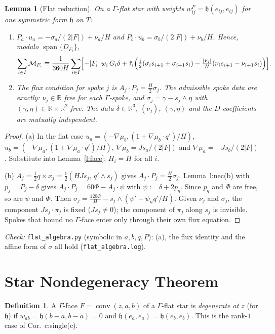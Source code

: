 \documentclass[11pt]{article}
\newtheorem{lemma}[theorem]{Lemma}
\theoremstyle{definition}
\newtheorem{definition}[theorem]{Definition}
\newcommand{\R}{\mathbb R}
\newcommand{\M}{\mathcal M}
\newcommand{\hh}{\mathfrak h}
\DeclareMathOperator{\conv}{conv}
\begin{document}
\begin{lemma}[Flat reduction]\label{l:flat}
On a $\Gamma$-flat star with weights $w^{F}_{ij}=\hh(e_{ij},e_{ij})$ for one symmetric form $\hh$ on $T$:
\begin{enumerate}[label=(\alph*)]
\item $P_a\cdot u_a=-\sigma_a/(2|F|)+\nu_a/H$ and $P_b\cdot u_b=\sigma_b/(2|F|)+\nu_b/H$. Hence, modulo $\operatorname{span}\{D_{F_i}\}$,
\[
\sum_{i\in I}\M_{F_i}\equiv\frac1{360H}\sum_{i\in I}\Bigl[-|F_i|\,w_i\,G_i\delta+\hat\tau_i\Bigl(\tfrac12(\sigma_is_{i+1}+\sigma_{i+1}s_i)-\tfrac{|F_i|}{H}(\nu_is_{i+1}-\nu_{i+1}s_i)\Bigr)\Bigr].
\]
\item The flux condition for spoke $j$ is $A_j\cdot P_j=\frac H2\sigma_j$. The admissible spoke data are exactly: $\nu_j\in\R$ free for each $\Gamma$-spoke, and $\sigma_j=\gamma-s_j\wedge\eta$ with $(\gamma,\eta)\in\R\times\R^2$ free. The data $\delta\in\R^3$, $(\nu_j)$, $(\gamma,\eta)$ and the $D$-coefficients are mutually independent.
\end{enumerate}
\end{lemma}
\begin{proof}
(a) In the flat case $u_a=(-\nabla\mu_b,(1+\nabla\mu_b\cdot q')/H)$, $u_b=(-\nabla\mu_a,(1+\nabla\mu_a\cdot q')/H)$, $\nabla\mu_b=Js_a/(2|F|)$ and $\nabla\mu_a=-Js_b/(2|F|)$. Substitute into Lemma~\ref{l:face}; $H_i=H$ for all $i$.

(b) $A_j=\frac12q\times x_j=\frac12(HJs_j,\,q'\wedge s_j)$ gives $A_j\cdot P_j=\frac H2\sigma_j$. Lemma~l:nec(b) with $p_j=P_j-\delta$ gives $A_j\cdot P_j=60\Phi-A_j\cdot\psi$ with $\psi:=\delta+2p_q$. Since $p_q$ and $\Phi$ are free, so are $\psi$ and $\Phi$. Then $\sigma_j=\frac{120\Phi}H-s_j\wedge(\psi'-\psi_nq'/H)$. Given $\nu_j$ and $\sigma_j$, the component $Js_j\cdot\pi_j$ is fixed ($Js_j\neq0$); the component of $\pi_j$ along $s_j$ is invisible. Spokes that bound no $\Gamma$-face enter only through their own flux equation.
\end{proof}
\emph{Check:} \texttt{flat\_algebra.py} (symbolic in $a,b,q,P$): (a), the flux identity and the affine form of $\sigma$ all hold (\texttt{flat\_algebra.log}).

\section{Star Nondegeneracy Theorem}\label{s:nondeg}
\begin{definition}
A $\Gamma$-face $F=\conv(z,a,b)$ of a $\Gamma$-flat star is \emph{degenerate at $z$} (for $\hh$) if $w_{ab}=\hh(b-a,b-a)=0$ and $\hh(e_a,e_a)=\hh(e_b,e_b)$. This is the rank-$1$ case of Cor.~c:single(c).
\end{definition}
\end{document}
